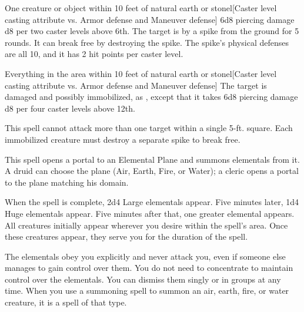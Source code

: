 \spellrng{\rngmed}
\begin{spelltarget}{One creature or object within 10 feet of natural earth or stone}l[Caster level \add casting attribute vs. Armor defense and Maneuver defense]
     6d8 piercing damage \add d8 per two caster levels above 6th.
     The target is \immobilized by a spike from the ground for 5 rounds. It can break free by destroying the spike. The spike's physical defenses are all 10, and it has 2 hit points per caster level.
\end{spelltarget}

\spellrng{\rngmed}
\begin{spelltargets}{Everything in the area within 10 feet of natural earth or stone}l[Caster level \add casting attribute vs. Armor defense and Maneuver defense]
    \spellsuccess The target is damaged and possibly immobilized, as , except that it takes 6d8 piercing damage \add d8 per four caster levels above 12th.
\end{spelltargets}
\spellnotes This spell cannot attack more than one target within a single 5-ft. square. Each immobilized creature must destroy a separate spike to break free.

\spelldur{\durlong \dismissable}
\spellline
\spelleffect This spell opens a portal to an Elemental Plane and summons elementals from it. A druid can choose the plane (Air, Earth, Fire, or Water); a cleric opens a portal to the plane matching his domain.
\par When the spell is complete, 2d4 Large elementals appear. Five minutes later, 1d4 Huge elementals appear. Five minutes after that, one greater elemental appears. All creatures initially appear wherever you desire within the spell's area. Once these creatures appear, they serve you for the duration of the spell.
\par The elementals obey you explicitly and never attack you, even if someone else manages to gain control over them. You do not need to concentrate to maintain control over the elementals. You can dismiss them singly or in groups at any time.
\spellnotes When you use a summoning spell to summon an air, earth, fire, or water creature, it is a spell of that type.

